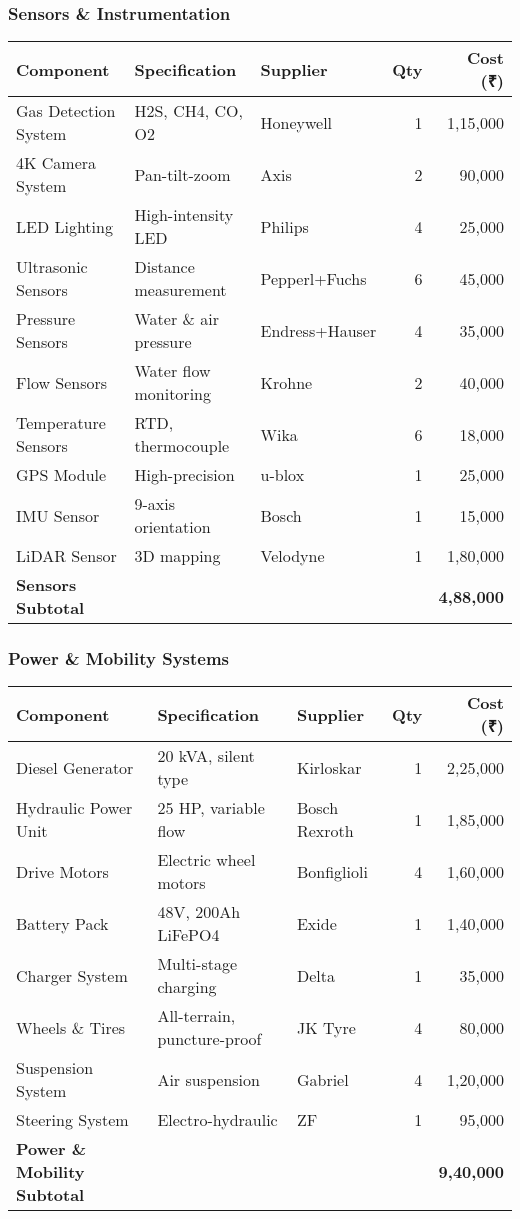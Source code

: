 \documentclass[11pt,a4paper]{article}
\begin{document}
\subsubsection{Sensors \& Instrumentation}
\begin{center}
\small
\begin{tabular}{lllrr}
\toprule
\textbf{Component} & \textbf{Specification} & \textbf{Supplier} & \textbf{Qty} & \textbf{Cost (₹)} \\
\midrule
Gas Detection System & H2S, CH4, CO, O2 & Honeywell & 1 & 1,15,000 \\
4K Camera System & Pan-tilt-zoom & Axis & 2 & 90,000 \\
LED Lighting & High-intensity LED & Philips & 4 & 25,000 \\
Ultrasonic Sensors & Distance measurement & Pepperl+Fuchs & 6 & 45,000 \\
Pressure Sensors & Water \& air pressure & Endress+Hauser & 4 & 35,000 \\
Flow Sensors & Water flow monitoring & Krohne & 2 & 40,000 \\
Temperature Sensors & RTD, thermocouple & Wika & 6 & 18,000 \\
GPS Module & High-precision & u-blox & 1 & 25,000 \\
IMU Sensor & 9-axis orientation & Bosch & 1 & 15,000 \\
LiDAR Sensor & 3D mapping & Velodyne & 1 & 1,80,000 \\
\midrule
\textbf{Sensors Subtotal} & & & & \textbf{4,88,000} \\
\bottomrule
\end{tabular}
\end{center}

\subsubsection{Power \& Mobility Systems}
\begin{center}
\small
\begin{tabular}{lllrr}
\toprule
\textbf{Component} & \textbf{Specification} & \textbf{Supplier} & \textbf{Qty} & \textbf{Cost (₹)} \\
\midrule
Diesel Generator & 20 kVA, silent type & Kirloskar & 1 & 2,25,000 \\
Hydraulic Power Unit & 25 HP, variable flow & Bosch Rexroth & 1 & 1,85,000 \\
Drive Motors & Electric wheel motors & Bonfiglioli & 4 & 1,60,000 \\
Battery Pack & 48V, 200Ah LiFePO4 & Exide & 1 & 1,40,000 \\
Charger System & Multi-stage charging & Delta & 1 & 35,000 \\
Wheels \& Tires & All-terrain, puncture-proof & JK Tyre & 4 & 80,000 \\
Suspension System & Air suspension & Gabriel & 4 & 1,20,000 \\
Steering System & Electro-hydraulic & ZF & 1 & 95,000 \\
\midrule
\textbf{Power \& Mobility Subtotal} & & & & \textbf{9,40,000} \\
\bottomrule
\end{tabular}
\end{center}
\end{document}
